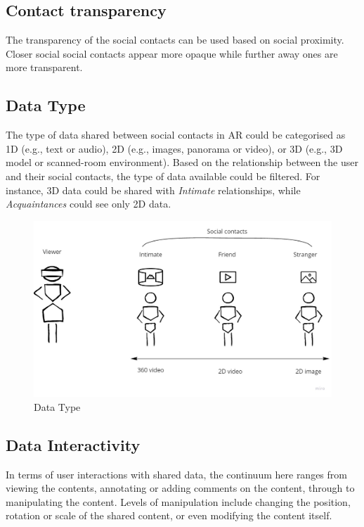\subsection{Contact transparency}

The transparency of the social contacts can be used based on social proximity. Closer social social contacts appear more opaque while further away ones are more transparent.

\subsection{Data Type}

The type of data shared between social contacts in AR could be categorised as 1D (e.g., text or audio), 2D (e.g., images, panorama or video), or 3D (e.g., 3D model or scanned-room environment). Based on the relationship between the user and their social contacts, the type of data available could be filtered. For instance, 3D data could be shared with \textit{Intimate} relationships, while \textit{Acquaintances} could see only 2D data.  

\begin{figure}[h]
    \centering
    \includegraphics[width=.8\linewidth]{images/Continuum-Data-type.jpg}
    \caption{Data Type}
    \label{fig:continuum:data-type}
\end{figure}

\subsection{Data Interactivity}

In terms of user interactions with shared data, the continuum here ranges from viewing the contents, annotating or adding comments on the content, through to manipulating the content. Levels of manipulation include changing the position, rotation or scale of the shared content, or even modifying the content itself.

